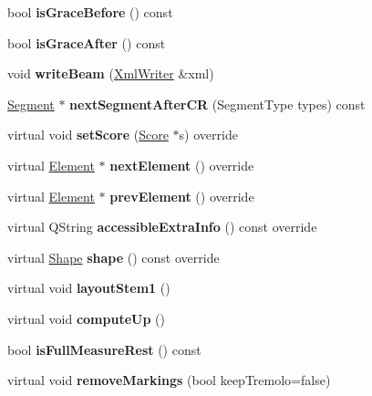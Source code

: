 \begin{DoxyCompactItemize}
bool {\bfseries is\+Grace\+Before} () const
\item 
\mbox{\label{class_ms_1_1_chord_rest_aa6f61c1efe6d552049ee902f28632243}} 
bool {\bfseries is\+Grace\+After} () const
\item 
\mbox{\label{class_ms_1_1_chord_rest_af9702ef559317fbc9faa01532f6e3c1e}} 
void {\bfseries write\+Beam} (\hyperlink{class_ms_1_1_xml_writer}{Xml\+Writer} \&xml)
\item 
\mbox{\label{class_ms_1_1_chord_rest_aa914cc2a56a9fa3790e69a91aff4771f}} 
\hyperlink{class_ms_1_1_segment}{Segment} $\ast$ {\bfseries next\+Segment\+After\+CR} (Segment\+Type types) const
\item 
\mbox{\label{class_ms_1_1_chord_rest_abf9774dbe43a1012f09ede1b8352edd2}} 
virtual void {\bfseries set\+Score} (\hyperlink{class_ms_1_1_score}{Score} $\ast$s) override
\item 
\mbox{\label{class_ms_1_1_chord_rest_a52f094713df92026a78c26f5a1bb894d}} 
virtual \hyperlink{class_ms_1_1_element}{Element} $\ast$ {\bfseries next\+Element} () override
\item 
\mbox{\label{class_ms_1_1_chord_rest_a5b5b7e93b97367c5c59da86349dcee82}} 
virtual \hyperlink{class_ms_1_1_element}{Element} $\ast$ {\bfseries prev\+Element} () override
\item 
\mbox{\label{class_ms_1_1_chord_rest_ab13ef528a7691f666a38dbc85ed84fb3}} 
virtual Q\+String {\bfseries accessible\+Extra\+Info} () const override
\item 
\mbox{\label{class_ms_1_1_chord_rest_a9263c16f6d004ee4fce1ae6633fd022d}} 
virtual \hyperlink{class_ms_1_1_shape}{Shape} {\bfseries shape} () const override
\item 
\mbox{\label{class_ms_1_1_chord_rest_af689585792f7920c671901274faae074}} 
virtual void {\bfseries layout\+Stem1} ()
\item 
\mbox{\label{class_ms_1_1_chord_rest_ad10e9b865b4832ba6615e33efca72853}} 
virtual void {\bfseries compute\+Up} ()
\item 
\mbox{\label{class_ms_1_1_chord_rest_ab43521662c782083c9befbf1149aa1ae}} 
bool {\bfseries is\+Full\+Measure\+Rest} () const
\item 
\mbox{\label{class_ms_1_1_chord_rest_a6fc9cb237164df7cecb329f33d1a81c4}} 
virtual void {\bfseries remove\+Markings} (bool keep\+Tremolo=false)
\end{DoxyCompactItemize}
